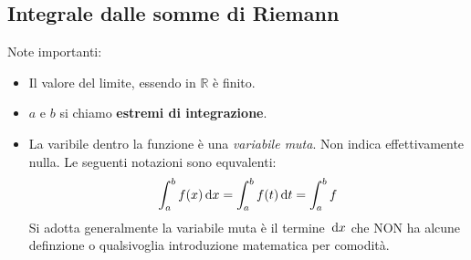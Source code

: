 \subsection{Integrale dalle somme di Riemann} %

Note importanti:
\begin{itemize}
	\item Il valore del limite, essendo in $\mathbb{R}$ è finito.
	
	\item $a$ e $b$ si chiamo \textbf{estremi di integrazione}.

	\item La varibile dentro la funzione è una \textit{variabile muta}. Non indica effettivamente nulla. Le seguenti notazioni sono equvalenti:
		\begin{equation*}
			\int_a^b f(x) \,\text{d} x = \int_a^b f(t) \,\text{d} t = \int_a^b f
		\end{equation*}
		Si adotta generalmente la variabile muta è il termine $\,\text{d} x$ che NON ha alcune definzione o qualsivoglia introduzione matematica per comodità.
\end{itemize}

